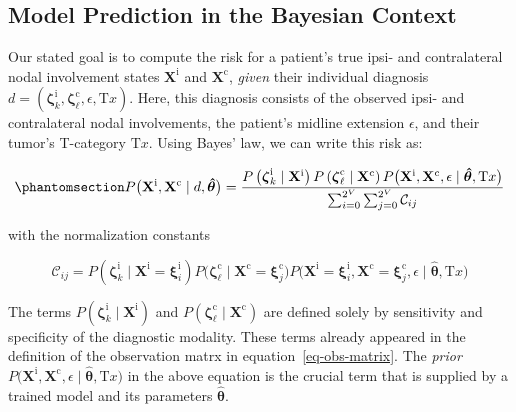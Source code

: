 \documentclass[
  sn-mathphys-num,
]{sn-jnl}
\begin{document}
\subsection{Model Prediction in the Bayesian
Context}\label{model-prediction-in-the-bayesian-context}

Our stated goal is to compute the risk for a patient's true ipsi- and
contralateral nodal involvement states \(\mathbf{X}^\text{i}\) and
\(\mathbf{X}^\text{c}\), \emph{given} their individual diagnosis
\(d = \left( \boldsymbol{\zeta}^\text{i}_k, \boldsymbol{\zeta}^\text{c}_\ell, \epsilon, \text{T}x \right)\).
Here, this diagnosis consists of the observed ipsi- and contralateral
nodal involvements, the patient's midline extension \(\epsilon\), and
their tumor's T-category \(\text{T}x\). Using Bayes' law, we can write
this risk as:

\begin{equation}\phantomsection\label{eq-uni-bayes-law}{
P \big( \mathbf{X}^\text{i}, \mathbf{X}^\text{c} \mid d, \boldsymbol{\hat{\theta}} \big)
= \frac{P \left( \boldsymbol{\zeta}^\text{i}_k \mid \mathbf{X}^\text{i} \right) P \left( \boldsymbol{\zeta}^\text{c}_\ell \mid \mathbf{X}^\text{c} \right) P \big( \mathbf{X}^\text{i}, \mathbf{X}^\text{c}, \epsilon \mid \boldsymbol{\hat{\theta}}, \text{T}x \big)}
{\sum_{i=0}^{2^V} \sum_{j=0}^{2^V} \mathcal{C}_{ij}}
}\end{equation}

with the normalization constants

\[
\mathcal{C}_{ij} = P \left( \boldsymbol{\zeta}^\text{i}_k \mid \mathbf{X}^\text{i}=\boldsymbol{\xi}^\text{i}_i \right) P \big( \boldsymbol{\zeta}^\text{c}_\ell \mid \mathbf{X}^\text{c}=\boldsymbol{\xi}^\text{c}_j \big) P \big( \mathbf{X}^\text{i}=\boldsymbol{\xi}^\text{i}_i, \mathbf{X}^\text{c}=\boldsymbol{\xi}^\text{c}_j, \epsilon \mid \boldsymbol{\hat{\theta}}, \text{T}x \big)
\]

The terms
\(P \left( \boldsymbol{\zeta}^\text{i}_k \mid \mathbf{X}^\text{i} \right)\)
and
\(P \left( \boldsymbol{\zeta}^\text{c}_\ell \mid \mathbf{X}^\text{c} \right)\)
are defined solely by sensitivity and specificity of the diagnostic
modality. These terms already appeared in the definition of the
observation matrx in equation~\ref{eq-obs-matrix}. The \emph{prior}
\(P \big( \mathbf{X}^\text{i}, \mathbf{X}^\text{c}, \epsilon \mid \boldsymbol{\hat{\theta}}, \text{T}x \big)\)
in the above equation is the crucial term that is supplied by a trained
model and its parameters \(\boldsymbol{\hat{\theta}}\).
\end{document}
